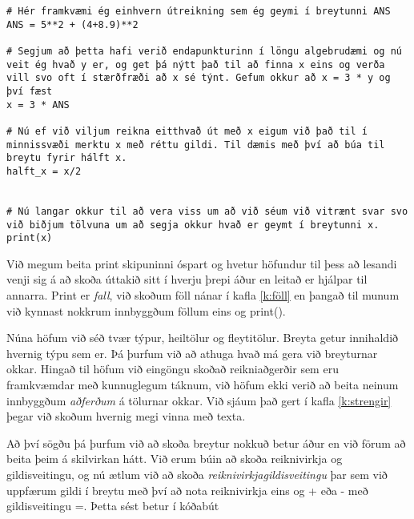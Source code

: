 \begin{lstlisting}[caption=Að nota breytu, label=lst:notabreytu]
# Hér framkvæmi ég einhvern útreikning sem ég geymi í breytunni ANS
ANS = 5**2 + (4+8.9)**2

# Segjum að þetta hafi verið endapunkturinn í löngu algebrudæmi og nú veit ég hvað y er, og get þá nýtt það til að finna x eins og verða vill svo oft í stærðfræði að x sé týnt. Gefum okkur að x = 3 * y og því fæst
x = 3 * ANS

# Nú ef við viljum reikna eitthvað út með x eigum við það til í minnissvæði merktu x með réttu gildi. Til dæmis með því að búa til breytu fyrir hálft x.
halft_x = x/2


# Nú langar okkur til að vera viss um að við séum við vitrænt svar svo við biðjum tölvuna um að segja okkur hvað er geymt í breytunni x.
print(x)

\end{lstlisting}

Við megum beita print skipuninni óspart og hvetur höfundur til þess að lesandi venji sig á að skoða úttakið sitt í hverju þrepi áður en leitað er hjálpar til annarra.
Print er \textit{fall}, við skoðum föll nánar í kafla \ref{k:föll} en þangað til munum við kynnast nokkrum innbyggðum föllum eins og print().

Núna höfum við séð tvær týpur, heiltölur og fleytitölur.
Breyta getur innihaldið hvernig týpu sem er.
Þá þurfum við að athuga hvað má gera við breyturnar okkar.
Hingað til höfum við eingöngu skoðað reikniaðgerðir sem eru framkvæmdar með kunnuglegum táknum, við höfum ekki verið að beita neinum innbyggðum \textit{aðferðum} á tölurnar okkar.
Við sjáum það gert í kafla \ref{k:strengir} þegar við skoðum hvernig megi vinna með texta.

Að því sögðu þá þurfum við að skoða breytur nokkuð betur áður en við förum að beita þeim á skilvirkan hátt.
Við erum búin að skoða reiknivirkja og gildisveitingu, og nú ætlum við að skoða \textit{reiknivirkjagildisveitingu} þar sem við uppfærum gildi í breytu með því að nota reiknivirkja eins og + eða - með gildisveitingu =.
Þetta sést betur í kóðabút

